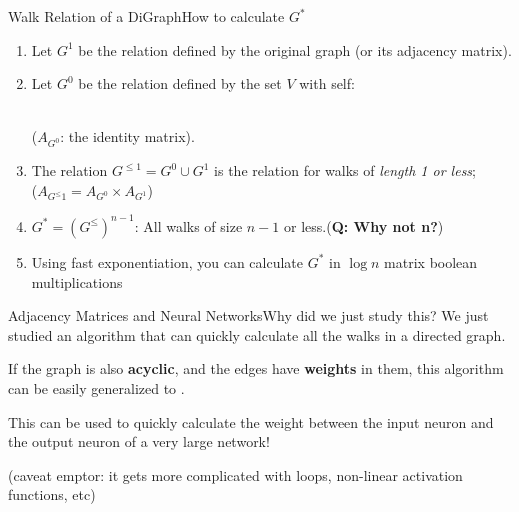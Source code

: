 \begin{frame}[t]{Walk Relation of a DiGraph}{How to calculate $G^*$}

  \begin{enumerate}
  \item Let $G^1$ be the relation defined by the original graph (or its adjacency matrix).\medskip

  \item Let $G^0$ be the relation defined by the set $V$ with self:
    \\
    ($A_{G^0}$: the identity matrix).\medskip

  \item The relation $G^{\leq 1} = G^0 \cup G^1$ is the relation for walks of \emph{length 1 or less};\\
  ($A_{G^\leq 1} = A_{G^0} \times A_{G^1}$)\medskip

  \item $G^* = (G^{\leq})^{n-1}$: All walks of size $n-1$ or less.\hfill ({\bf Q: Why not n?})\medskip 
  
  \item Using fast exponentiation, you can calculate $G^*$ in $\log n$ matrix boolean multiplications
  \end{enumerate}
\end{frame}

\begin{frame}[t]{Adjacency Matrices and Neural Networks}{Why did we just study this?}
  We just studied an algorithm that can quickly calculate all the walks in a directed graph.\bigskip 

  If the graph is also {\bf acyclic}, and the edges have {\bf weights} in them, this algorithm can be easily generalized to .\bigskip 

  This can be used to quickly calculate the weight between the input neuron and the output neuron of a very large network!\bigskip


  \vfill 
  (caveat emptor: it gets more complicated with loops, non-linear activation functions, etc)
\end{frame}

